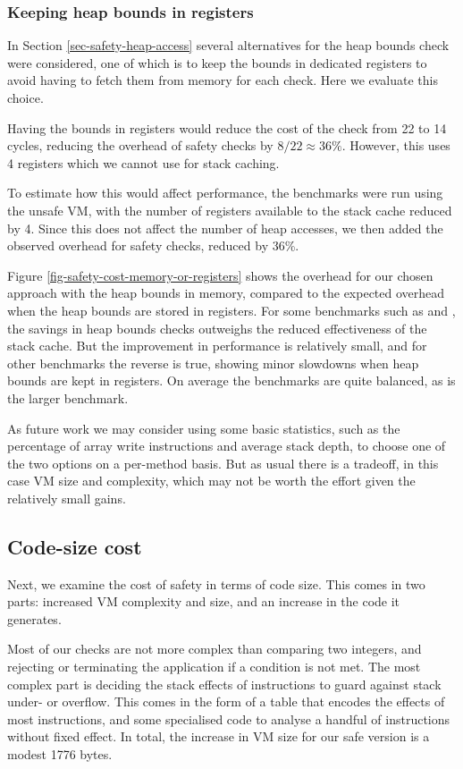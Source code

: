 \subsubsection{Keeping heap bounds in registers}
In Section \ref{sec-safety-heap-access} several alternatives for the heap bounds check were considered, one of which is to keep the bounds in dedicated registers to avoid having to fetch them from memory for each check. Here we evaluate this choice.

Having the bounds in registers would reduce the cost of the check from 22 to 14 cycles, reducing the overhead of safety checks by $8/22 \approx 36\%$. However, this uses 4 registers which we cannot use for stack caching.

To estimate how this would affect performance, the benchmarks were run using the unsafe VM, with the number of registers available to the stack cache reduced by 4. Since this does not affect the number of heap accesses, we then added the observed overhead for safety checks, reduced by 36\%.

Figure \ref{fig-safety-cost-memory-or-registers} shows the overhead for our chosen approach with the heap bounds in memory, compared to the expected overhead when the heap bounds are stored in registers. For some benchmarks such as  and , the savings in heap bounds checks outweighs the reduced effectiveness of the stack cache. But the improvement in performance is relatively small, and for other benchmarks the reverse is true, showing minor slowdowns when heap bounds are kept in registers. On average the benchmarks are quite balanced, as is the larger  benchmark.

As future work we may consider using some basic statistics, such as the percentage of array write instructions and average stack depth, to choose one of the two options on a per-method basis. But as usual there is a tradeoff, in this case VM size and complexity, which may not be worth the effort given the relatively small gains.

\subsection{Code-size cost}
Next, we examine the cost of safety in terms of code size. This comes in two parts: increased VM complexity and size, and an increase in the code it generates.

Most of our checks are not more complex than comparing two integers, and rejecting or terminating the application if a condition is not met. The most complex part is deciding the stack effects of instructions to guard against stack under- or overflow. This comes in the form of a table that encodes the effects of most instructions, and some specialised code to analyse a handful of instructions without fixed effect. In total, the increase in VM size for our safe version is a modest 1776 bytes.

